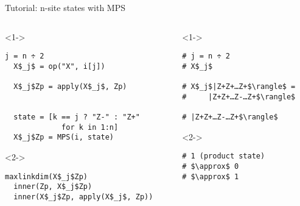 \begin{frame}[fragile]{Tutorial: n-site states with MPS}


\begin{columns}

\begin{column}{6cm}

\begin{onlyenv}<1->

\begin{lstlisting}[language=JuliaLocal, style=julia, mathescape, basicstyle=\small]
  j = n ÷ 2
  X$_j$ = op("X", i[j])

  X$_j$Zp = apply(X$_j$, Zp)


  state = [k == j ? "Z-" : "Z+"
             for k in 1:n]
  X$_j$Zp = MPS(i, state)
\end{lstlisting}

\end{onlyenv}

\begin{onlyenv}<2->

\begin{lstlisting}[language=JuliaLocal, style=julia, mathescape, basicstyle=\small]
  maxlinkdim(X$_j$Zp)
  inner(Zp, X$_j$Zp)
  inner(X$_j$Zp, apply(X$_j$, Zp))
\end{lstlisting}

\end{onlyenv}

\end{column}

\begin{column}{4cm}

\begin{onlyenv}<1->

\begin{lstlisting}[style=julia, numbers=none, mathescape, basicstyle=\small]
# j = n ÷ 2
# X$_j$

# X$_j$|Z+Z+…Z+$\rangle$ =
#     |Z+Z+…Z-…Z+$\rangle$

# |Z+Z+…Z-…Z+$\rangle$

 \end{lstlisting}

\end{onlyenv}

\begin{onlyenv}<2->

\begin{lstlisting}[style=julia, numbers=none, mathescape, basicstyle=\small]
# 1 (product state)
# $\approx$ 0
# $\approx$ 1
\end{lstlisting}

\end{onlyenv}

\end{column}

\end{columns}

\end{frame}
